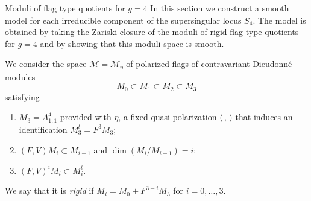\documentclass[11pt]{amsart}
\numberwithin{equation}{section}
\theoremstyle{definition}
\theoremstyle{remark}
\begin{document}


\begin{section}{Moduli of flag type quotients for $g=4$} \label{g=4flagtypes}
In this section we construct a smooth model for each irreducible
component of the supersingular locus $S_4$. 
The model is obtained by taking 
the Zariski closure of the moduli of rigid 
flag type quotients for $g=4$ and by showing that this
moduli space is smooth. 

We consider the space $\mathcal{M}=\mathcal{M}_{\eta}$
of polarized flags of contravariant Dieudonn\'e
modules
$$
M_0 \subset M_1 \subset M_2 \subset M_3
$$
satisfying
\begin{enumerate}
\item{} $M_3=A_{1,1}^4$ provided with $\eta$, a fixed quasi-polarization $\langle \, , \, \rangle$ that induces an identification $M_3^t= F^3M_3$;
\item{} $(F,V)M_i \subset M_{i-1}$ and $\dim (M_i/M_{i-1})=i$;
\item{} $(F,V)^iM_i\subset M_i^t$.
\end{enumerate}
We say that it is {\sl rigid} if $M_i=M_0+F^{3-i}M_3$ for $i=0,\ldots,3$.


\end{section}
\end{document}
